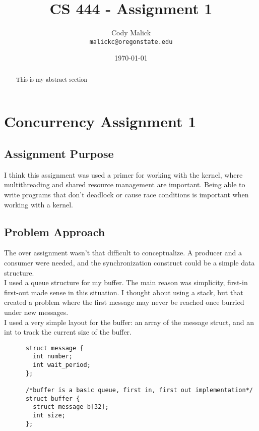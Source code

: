 \documentclass[10pt,letterpaper]{article}
\begin{document}
\begin{titlepage}
  \title{CS 444 - Assignment 1}
  \author{Cody Malick\\
  \texttt{malickc@oregonstate.edu}}
  \date{\today}
  \maketitle

  \begin{abstract}
      This is my abstract section
  \end{abstract}

\end{titlepage}

\tableofcontents
\clearpage

\section{Concurrency Assignment 1}
  \subsection{Assignment Purpose}
    I think this assignment was used a primer for working with the kernel, where
    multithreading and shared resource management are important. Being able to
    write programs that don't deadlock or cause race conditions is important
    when working with a kernel. \\

  \subsection{Problem Approach}
    The over assignment wasn't that difficult to conceptualize. A producer and
    a consumer were needed, and the synchronization construct could be a simple
    data structure.\\

    \noindent I used a queue structure for my buffer. The main reason was
    simplicity, first-in first-out made sense in this situation. I thought about
    using a stack, but that created a problem where the first message may never
    be reached once burried under new messages.\\

    \noindent I used a very simple layout for the buffer: an array of the message
    struct, and an int to track the current size of the buffer.

    \begin{lstlisting}
      struct message {
      	int number;
      	int wait_period;
      };

      /*buffer is a basic queue, first in, first out implementation*/
      struct buffer {
      	struct message b[32];
      	int size;
      };
    \end{lstlisting}
\end{document}
